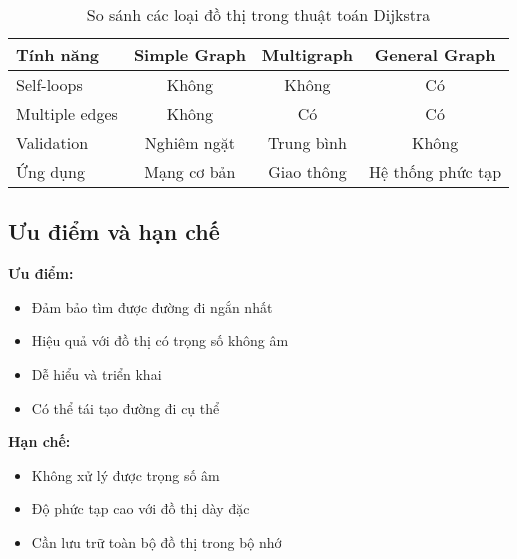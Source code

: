 \documentclass[12pt]{article}
\begin{document}
\begin{table}[H]
\centering
\begin{tabular}{|l|c|c|c|}
\hline
\textbf{Tính năng} & \textbf{Simple Graph} & \textbf{Multigraph} & \textbf{General Graph} \\
\hline
Self-loops & Không & Không & Có \\
Multiple edges & Không & Có & Có \\
Validation & Nghiêm ngặt & Trung bình & Không \\
Ứng dụng & Mạng cơ bản & Giao thông & Hệ thống phức tạp \\
\hline
\end{tabular}
\caption{So sánh các loại đồ thị trong thuật toán Dijkstra}
\end{table}

\subsection*{Ưu điểm và hạn chế}

\textbf{Ưu điểm:}
\begin{itemize}
    \item Đảm bảo tìm được đường đi ngắn nhất
    \item Hiệu quả với đồ thị có trọng số không âm
    \item Dễ hiểu và triển khai
    \item Có thể tái tạo đường đi cụ thể
\end{itemize}

\textbf{Hạn chế:}
\begin{itemize}
    \item Không xử lý được trọng số âm
    \item Độ phức tạp cao với đồ thị dày đặc
    \item Cần lưu trữ toàn bộ đồ thị trong bộ nhớ
\end{itemize}
\end{document}
